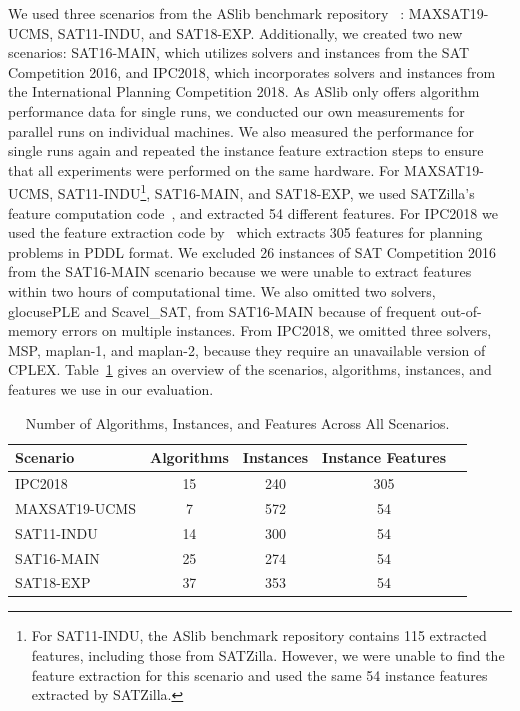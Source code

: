 We used three scenarios from the ASlib benchmark repository ~\cite{BISCHL201641}: MAXSAT19-UCMS, SAT11-INDU, and SAT18-EXP. Additionally, we created two new scenarios: SAT16-MAIN, which utilizes solvers and instances from the SAT Competition 2016, and IPC2018, which incorporates solvers and instances from the International Planning Competition 2018. As ASlib only offers algorithm performance data for single runs, we conducted our own measurements for parallel runs on individual machines. We also measured the performance for single runs again and repeated the instance feature extraction steps to ensure that all experiments were performed on the same hardware. For MAXSAT19-UCMS, SAT11-INDU\footnote{For SAT11-INDU, the ASlib benchmark repository contains 115 extracted features, including those from SATZilla. However, we were unable to find the feature extraction for this scenario and used the same 54 instance features extracted by SATZilla.}, SAT16-MAIN, and SAT18-EXP, we used SATZilla’s feature computation code~\cite{satzilla}, and extracted 54 different features. For IPC2018 we used the feature extraction code by~\cite{Fawcett_Vallati_Hutter_Hoffmann_Hoos_Leyton-Brown_2014} which extracts 305 features for planning problems in PDDL format. We excluded 26 instances of SAT Competition 2016 from the SAT16-MAIN scenario because we were unable to extract features within two hours of computational time. 
We also omitted two solvers, glocusePLE and Scavel\_SAT, from SAT16-MAIN because of frequent out-of-memory errors on multiple instances. From IPC2018, we omitted three solvers, MSP, maplan-1, and maplan-2, because they require an unavailable version of CPLEX. Table~\ref{tab:scenarios} gives an overview of the scenarios, algorithms, instances, and features we use in our evaluation.

\begin{table}
\centering
\caption{Number of Algorithms, Instances, and Features Across All Scenarios.}
\label{tab:scenarios}
\begin{tabular}{p{5cm} cccc}
\toprule
Scenario & Algorithms & Instances & Instance Features\\
\midrule
IPC2018 & 15 & 240 & 305\\
MAXSAT19-UCMS & 7 & 572 & 54\\
SAT11-INDU & 14 & 300 & 54\\
SAT16-MAIN & 25 & 274 & 54\\
SAT18-EXP & 37 & 353 & 54\\
\bottomrule
\end{tabular}
\end{table}


